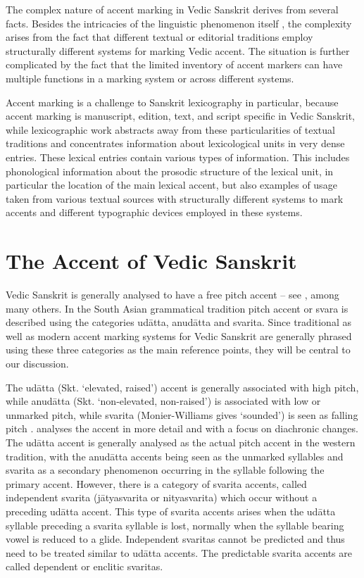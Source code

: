 The complex nature of accent marking in Vedic Sanskrit derives from several facts. Besides the intricacies of the linguistic phenomenon itself \citep[see][among others]{Kiparsky1973}, the complexity arises from the fact that different textual or editorial traditions employ structurally different systems for marking Vedic accent. The situation is further complicated by the fact that the limited inventory of accent markers can have multiple functions in a marking system or across different systems.

Accent marking is a challenge to Sanskrit lexicography in particular, because accent marking is manu\-script, edition, text, and script specific in Vedic Sanskrit, while lexicographic work abstracts away from these particularities of textual traditions and concentrates information about lexicological units in very dense entries. These lexical entries contain various types of information. This includes phonological information about the prosodic structure of the lexical unit, in particular the location of the main lexical accent, but also examples of usage taken from various textual sources with structurally different systems to mark accents and different typographic devices employed in these systems.

\section{The Accent of Vedic Sanskrit}

Vedic Sanskrit is generally analysed to have a free pitch accent – see \citet{Kiparsky1973}, \citet{Lubotsky1988} among many others. In the South Asian grammatical tradition pitch accent or svara is described using the categories udātta, anudātta and svarita. Since traditional as well as modern accent marking systems for Vedic Sanskrit are generally phrased using these three categories as the main reference points, they will be central to our discussion.

The udātta (Skt. ‘elevated, raised’) accent is generally associated with high pitch, while anudātta (Skt. ‘non-elevated, non-raised’) is associated with low or unmarked pitch, while svarita (Monier-Williams gives ‘sounded’) is seen as falling pitch \citep[p.~27]{Whitney1869}. \citet{Kiparsky1973} analyses the accent in more detail and with a focus on diachronic changes. The udātta accent is generally analysed as the actual pitch accent in the western tradition, with the anudātta accents being seen as the unmarked syllables and svarita as a secondary phenomenon occurring in the syllable following the primary accent. However, there is a category of svarita accents, called independent svarita (jātyasvarita or nityasvarita) which occur without a preceding udātta accent. This type of svarita accents arises when the udātta syllable preceding a svarita syllable is lost, normally when the syllable bearing vowel is reduced to a glide. Independent svaritas cannot be predicted and thus need to be treated similar to udātta accents. The predictable svarita accents are called dependent or enclitic svaritas.

